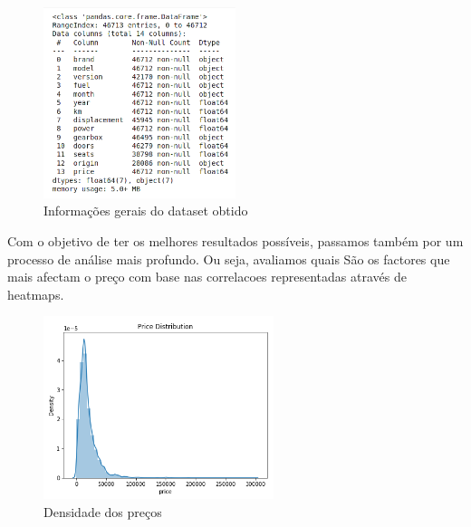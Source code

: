\documentclass[a4paper]{report}
\begin{document}
\begin{figure}[H]
    \centering
    \includegraphics[width=0.5\textwidth]{images/data_understanding.png}
    \caption{Informações gerais do dataset obtido}
\end{figure}

Com o objetivo de ter os melhores resultados possíveis, passamos também por um processo
de análise mais profundo. Ou seja, avaliamos quais São os factores que mais afectam o preço
com base nas correlacoes representadas através de heatmaps.

\begin{figure}[H]
    \centering
    \includegraphics[width=0.6\textwidth]{images/price_density.png}
    \caption{Densidade dos preços}
\end{figure}
\end{document}
